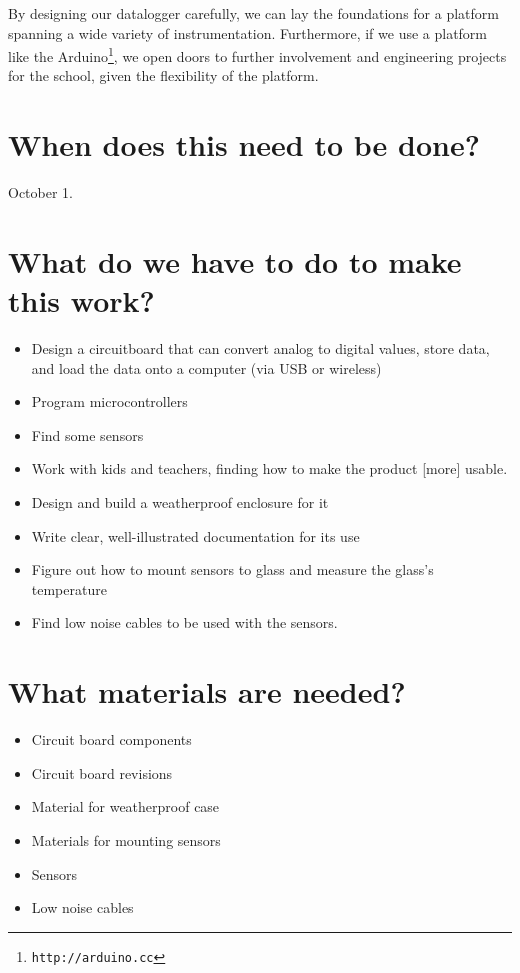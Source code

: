 \documentclass[11pt]{article}
\begin{document}
By designing our datalogger carefully, we can lay the foundations for a platform spanning a wide variety of instrumentation.  Furthermore, if we use a platform like the Arduino\footnote{\texttt{http://arduino.cc}}, we open doors to further involvement and engineering projects for the school, given the flexibility of the platform.


\section{When does this need to be done?}
October 1.


\section{What do we have to do to make this work?}
\begin{itemize}
\item Design a circuitboard that can convert analog to digital values, store data, and load the data onto a computer (via USB or wireless)
\item Program microcontrollers
\item Find some sensors
\item Work with kids and teachers, finding how to make the product [more] usable.
\item Design and build a weatherproof enclosure for it
\item Write clear, well-illustrated documentation for its use
\item Figure out how to mount sensors to glass and measure the glass's temperature
\item Find low noise cables to be used with the sensors.
\end{itemize}


\section{What materials are needed?}
\begin{itemize}
\item Circuit board components
\item Circuit board revisions
\item Material for weatherproof case
\item Materials for mounting sensors
\item Sensors 
\item Low noise cables
\end{itemize}
\end{document}
